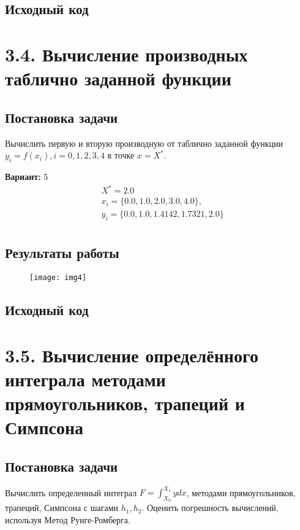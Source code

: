 \subsection{Исходный код}

\pagebreak

\section* {3.4. Вычисление производных таблично заданной функции}

\setcounter{subsection}{0}


\subsection{Постановка задачи}
Вычислить первую и вторую производную от таблично заданной функции $y_i = f(x_i), i = 0, 1, 2, 3, 4$ в точке $x = X^*$.  

{\bfseries Вариант:} 5
\begin{align*}
& X^* = 2.0 \\
& x_i = \{0.0, 1.0, 2.0, 3.0, 4.0\}, \\
& y_i = \{0.0, 1.0, 1.4142, 1.7321, 2.0\} \\
\end{align*}

\subsection{Результаты работы}
\begin{figure}[h!]
\centering
\texttt{[image: img4]}
\end{figure}
\pagebreak

\subsection{Исходный код}

\pagebreak

\section* {3.5. Вычисление определённого интеграла методами прямоугольников, трапеций и Симпсона}

\setcounter{subsection}{0}


\subsection{Постановка задачи}
Вычислить определенный интеграл $F = \int_{X_0}^{X_1} y dx$, методами прямоугольников, трапеций, Симпсона с шагами $h_1, h_2$. Оценить погрешность вычислений, используя  Метод Рунге-Ромберга.  

